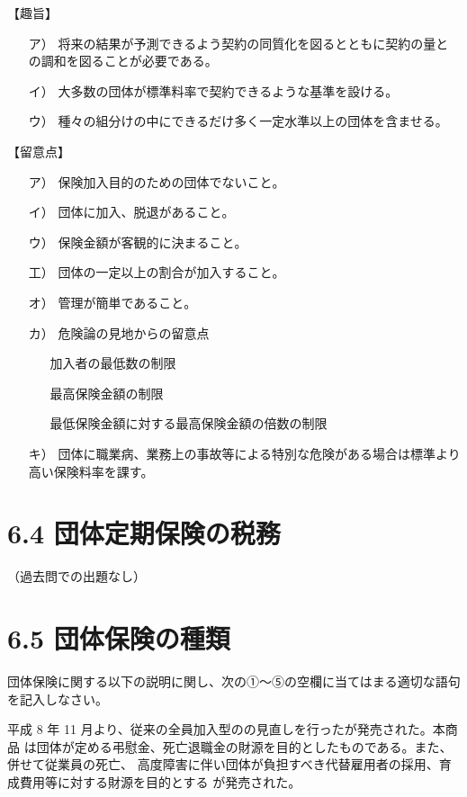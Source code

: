 \documentclass[report,gutter=10mm,fore-edge=10mm,uplatex,dvipdfmx]{jlreq}
\begin{document}
【趣旨】

\begin{itemize}
\item[ ア）] 将来の結果が予測できるよう契約の同質化を図るとともに契約の量との調和を図ることが必要である。
\item[ イ）] 大多数の団体が標準料率で契約できるような基準を設ける。
\item[ ウ）] 種々の組分けの中にできるだけ多く一定水準以上の団体を含ませる。
\end{itemize}

【留意点】

\begin{itemize}
\item[ ア）] 保険加入目的のための団体でないこと。
\item[ イ）] 団体に加入、脱退があること。
\item[ ウ）] 保険金額が客観的に決まること。
\item[ 工）] 団体の一定以上の割合が加入すること。
\item[ オ）] 管理が簡単であること。
\item[ カ）] 危険論の見地からの留意点
\begin{itemize}
 \item[ ] 加入者の最低数の制限
 \item[ ] 最高保険金額の制限
 \item[ ] 最低保険金額に対する最高保険金額の倍数の制限
\end{itemize}
\item[ キ）] 団体に職業病、業務上の事故等による特別な危険がある場合は標準より高い保険料率を課す。
\end{itemize}

\section{6.4 団体定期保険の税務}
（過去問での出題なし）

\section{6.5 団体保険の種類}

団体保険に関する以下の説明に関し、次の①～⑤の空欄に当てはまる適切な語句を記入しなさい。

平成 8 年 11 月より、従来の全員加入型のの見直しを行ったが発売された。本商品
は団体が定める弔慰金、死亡退職金の財源を目的としたものである。また、併せて従業員の死亡、
高度障害に伴い団体が負担すべき代替雇用者の採用、育成費用等に対する財源を目的とする
が発売された。
\end{document}
